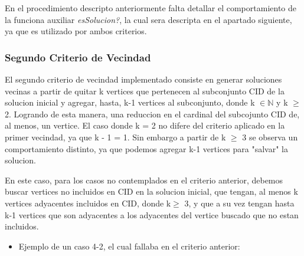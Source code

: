 En el procedimiento descripto anteriormente falta detallar el comportamiento de la funciona auxiliar \textit{esSolucion?}, la cual sera descripta en el apartado siguiente, ya que es utilizado por ambos criterios.

\subsubsection{Segundo Criterio de Vecindad}
El segundo criterio de vecindad implementado consiste en generar soluciones vecinas a partir de quitar k vertices que pertenecen al subconjunto CID de la solucion inicial y agregar, hasta, k-1 vertices al subconjunto, donde k $\in \mathbb{N}$ y k $\geq$ 2. Logrando de esta manera, una reduccion en el cardinal del subcojunto CID de, al menos, un vertice.
El caso donde k = 2 no difere del criterio aplicado en la primer vecindad, ya que k - 1 = 1. Sin embargo a partir de k $\geq$ 3 se observa un comportamiento distinto, ya que podemos agregar k-1 vertices para "salvar" la solucion.

En este caso, para los casos no contemplados en el criterio anterior, debemos buscar vertices no incluidos en CID en la solucion inicial, que tengan, al menos k vertices adyacentes incluidos en CID, donde k$\geq$ 3, y que a su vez tengan hasta k-1 vertices que son adyacentes a los adyacentes del vertice buscado que no estan incluidos.

\begin{itemize}
	\item Ejemplo de un caso 4-2, el cual fallaba en el criterio anterior:
    

\end{itemize}

